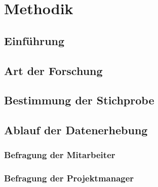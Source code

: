 
\chapter{Methodik}
\label{ch:methodik}

\section{Einführung}


\section{Art der Forschung}

\section{Bestimmung der Stichprobe}

\section{Ablauf der Datenerhebung}

\subsection{Befragung der Mitarbeiter}

\subsection{Befragung der Projektmanager}

